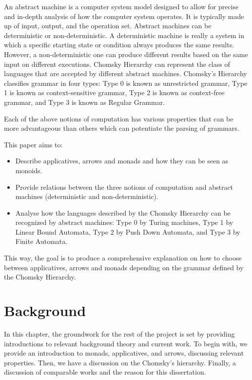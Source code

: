 \documentclass[12pt,twoside]{report}
\begin{document}
An abstract machine is a computer system model designed to allow for precise and in-depth analysis of how the computer system operates. It is typically made up of input, output, and the operation set. Abstract machines can be deterministic or non-deterministic. A deterministic machine is really a system in which a specific starting state or condition always produces the same results. However, a non-deterministic one can produce different results based on the same input on different executions. Chomsky Hierarchy can represent the class of languages that are accepted by different abstract machines. Chomsky's Hierarchy classifies grammar in four types: Type 0 is known as unrestricted grammar, Type 1 is known as context-sensitive grammar, Type 2 is known as context-free grammar, and Type 3 is known as Regular Grammar.

Each of the above notions of computation has various properties that can be more advantageous than others which can potentiate the parsing of grammars.

This paper aims to:
\begin{itemize}
    \item Describe applicatives, arrows and monads and how they can be seen as monoids.
    \item Provide relations between the three notions of computation and abstract machines (deterministic and non-deterministic).
    \item Analyse how the languages described by the Chomsky Hierarchy can be recognized by abstract machines: Type 0 by Turing machines, Type 1 by Linear Bound Automata, Type 2 by Push Down Automata, and Type 3 by Finite Automata.
\end{itemize}	
This way, the goal is to produce a comprehensive explanation on how to choose between applicatives, arrows and monads depending on the grammar defined by the Chomsky Hierarchy.

\chapter{Background}
In this chapter, the groundwork for the rest of the project is set by providing introductions to relevant background theory and current work. To begin with, we provide an introduction to monads, applicatives, and arrows, discussing relevant properties. Then, we have a discussion on the Chomsky's hierarchy. Finally, a discussion of comparable works and the reason for this dissertation.
\end{document}

